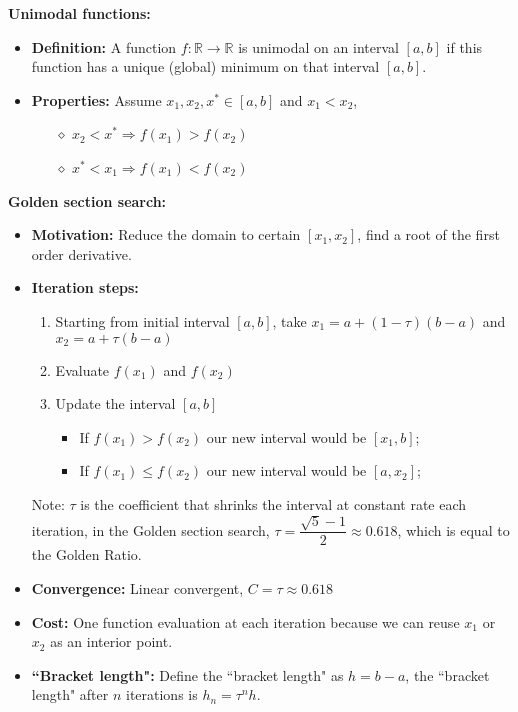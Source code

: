 \documentclass[12pt]{article}
\begin{document}
\medskip
\noindent \textbf{Unimodal functions:}
    \begin{itemize}
        \item \textbf{Definition:} A function $f:\mathbb{R}\to \mathbb{R}$ is unimodal on an interval $[a,b]$ if this function has a unique (global) minimum on that interval $[a,b]$.
        \item \textbf{Properties:} Assume $x_1, x_2, x^* \in [a, b]$ and $x_1 < x_2$, 
            \begin{itemize}
                \item [$\diamond$] $x_2 < x^*\Rightarrow f(x_1)>f(x_2)$
                \item [$\diamond$] $x^* < x_1\Rightarrow f(x_1)<f(x_2)$
            \end{itemize}
    \end{itemize}

\newpage
\noindent \textbf{Golden section search:}
    \begin{itemize}
        \item \textbf{Motivation:} Reduce the domain to certain $[x_1, x_2]$, find a root of the first order derivative.
        \item \textbf{Iteration steps:} 
            \begin{enumerate}
                \item Starting from initial interval $[a, b]$, take $x_1 = a + (1-\tau)(b-a)$ and $x_2 = a + \tau (b - a)$
                \item Evaluate $f(x_1)$ and $f(x_2)$
                \item Update the interval $[a, b]$
                    \begin{itemize}
                        \item If $f(x_1) > f(x_2)$ our new interval would be $[x_1, b]$;
                        \item If $f(x_1) \leq f(x_2)$ our new interval would be $[a, x_2]$;
                    \end{itemize}
            \end{enumerate}
            Note: $\tau$ is the coefficient that shrinks the interval at constant rate each iteration, in the Golden section search,  $\tau = \dfrac{\sqrt{5}-1}{2} \approx 0.618$, which is equal to the Golden Ratio.
        \item \textbf{Convergence:} Linear convergent, $C = \tau \approx 0.618$
        \item \textbf{Cost:} One function evaluation at each iteration because we can reuse $x_1$ or $x_2$ as an interior point.
        \item \textbf{``Bracket length":} Define the ``bracket length" as $h = b-a$, the ``bracket length" after $n$ iterations is $h_n = \tau^n h$.
    \end{itemize}
\end{document}

